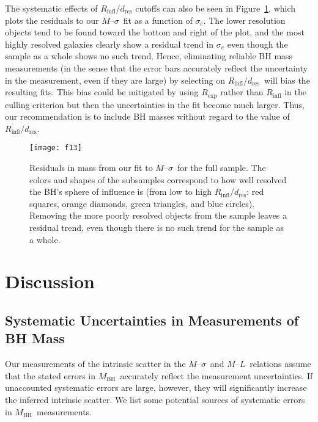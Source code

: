 \documentclass[twosided,letterpaper,numberedappendix]{emulateapj}
\newcommand{\msigma}   {\ensuremath{M}{--}\ensuremath{\sigma}}
\newcommand{\ml}       {\ensuremath{M}{--}\ensuremath{L}}
\newcommand{\mbh}      {\ensuremath{M_{\mathrm{BH}}}}
\newcommand{\rinfres} {\ensuremath{R_{\mathrm{infl}} / d_{\mathrm{res}}}}
\begin{document}
The systematic effects of $\rinfres$ cutoffs can also be seen in
Figure~\ref{f:msigmarinf}, which plots the residuals to our \msigma\
fit as a function of $\sigma_e$.  The lower resolution objects tend to
be found toward the bottom and right of the plot, and the most highly
resolved galaxies clearly show a residual trend in $\sigma_e$ even
though the sample as a whole shows no such trend. Hence, eliminating
reliable BH mass measurements (in the sense that the error
bars accurately reflect the uncertainty in the measurement, even if
they are large) by selecting on \rinfres\ will bias the resulting
fits.  This bias could be mitigated by using $R_{\mathrm{exp}}$ rather than
$R_{\mathrm{infl}}$ in the culling criterion but then the
uncertainties in the fit become much larger.  Thus, our recommendation
is to include BH masses without regard to the value of \rinfres.


\begin{figure}
\hspace{-0.75cm}\texttt{[image: f13]}
\caption{Residuals in mass from our fit to \msigma\ for the full
sample.  The colors and shapes of the subsamples correspond to how
well resolved the BH's sphere of influence is (from low to
high \rinfres: red squares, orange diamonds, green triangles, and blue
circles).  Removing the more poorly resolved objects from the sample
leaves a residual trend, even though there is no such trend for the
sample as a whole.
\bigskip
}
\label{f:msigmarinf}
\end{figure}




\section{Discussion}
\label{discuss}
\subsection{Systematic Uncertainties in Measurements of BH Mass}
\label{systematics}
Our measurements of the intrinsic scatter in the \msigma\ and \ml\
relations assume that the stated errors in \mbh\ accurately reflect the
measurement uncertainties.  If unaccounted systematic errors are
large, however, they will significantly increase the 
inferred intrinsic scatter.  We list some potential sources of
systematic errors in \mbh\ measurements.
\end{document}
